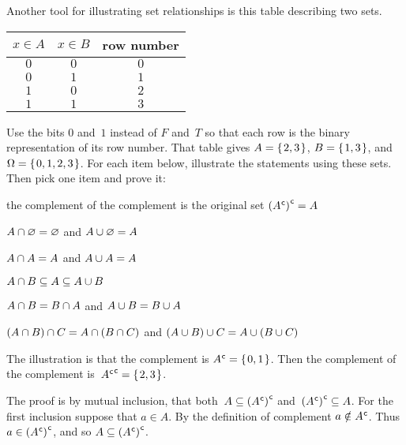 \documentclass{ibl}  %
\begin{document}
\begin{problem}
Another tool for illustrating set relationships is this table describing 
two sets.
\begin{center} \small
  \begin{tabular}{cc|c}
    $x\in A$  &$x\in B$  &row number \\ \hline
    $0$       &$0$       &$0$  \\
    $0$       &$1$       &$1$  \\
    $1$       &$0$       &$2$  \\
    $1$       &$1$       &$3$  
  \end{tabular}
\end{center}
Use the bits $0$ and~$1$ instead of $F$ and~$T$ so that each
row is the binary representation of its row number.
That table gives $A=\mbox{$\{\hspace{0.1em}2,3\hspace{0.1em}\}$}$, $B=\mbox{$\{\hspace{0.1em}1,3\hspace{0.1em}\}$}$, 
and~$\Omega=\mbox{$\{\hspace{0.1em}0,1,2,3\hspace{0.1em}\}$}$.
For each item below, illustrate the statements using these sets.
Then pick one item and prove it:
\begin{items}
\item the complement of the complement is the original set
  ${({A}^{\mspace{1mu}\mathsf{c}})}^{\mspace{1mu}\mathsf{c}}=A$  
\item $A\cap\varnothing=\varnothing$ and $A\cup\varnothing=A$  
\item {} $A\cap A=A$ and $A\cup A=A$    
\item $A\cap B\subseteq A\subseteq A\cup B$  
\item {}
   $A\cap B=B\cap A$ and
   $A\cup B=B\cup A$ 
\item {} 
  $(A\cap B)\cap C=A\cap (B\cap C)$
  and
  $(A\cup B)\cup C=A\cup (B\cup C)$ 
\end{items}
\begin{answer}
\begin{items}
\item  The illustration is that the complement is 
  ${A}^{\mspace{1mu}\mathsf{c}}=\mbox{$\{\hspace{0.1em}0,1\hspace{0.1em}\}$}$.
  Then the complement of the complement is~${{A}^{\mspace{1mu}\mathsf{c}}}^{\mspace{1mu}\mathsf{c}}=\mbox{$\{\hspace{0.1em}2,3\hspace{0.1em}\}$}$.
  
  The proof 
  is by mutual inclusion, that both~$A\subseteq{({A}^{\mspace{1mu}\mathsf{c}})}^{\mspace{1mu}\mathsf{c}}$
  and~${({A}^{\mspace{1mu}\mathsf{c}})}^{\mspace{1mu}\mathsf{c}}\subseteq A$.
  For the first inclusion suppose that $a\in A$.
  By the definition of complement $a\notin{A}^{\mspace{1mu}\mathsf{c}}$.
  Thus $a\in{({A}^{\mspace{1mu}\mathsf{c}})}^{\mspace{1mu}\mathsf{c}}$,
  and so $A\subseteq{({A}^{\mspace{1mu}\mathsf{c}})}^{\mspace{1mu}\mathsf{c}}$.


\end{items}
\end{answer}
\end{problem}
\end{document}
